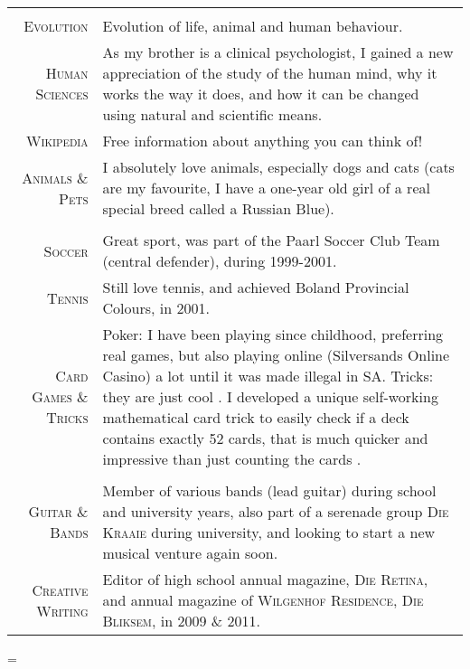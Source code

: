 \documentclass[a4paper,10pt,notitlepage]{article}
\newenvironment{absolutelynopagebreak}
  {\par\nobreak\vfil\penalty0\vfilneg
   \vtop\bgroup}
  {\par\xdef\tpd{\the\prevdepth}\egroup
   \prevdepth=\tpd}
\begin{document}
\begin{absolutelynopagebreak}
\begin{tabular}{r|p{11cm}}
		\multicolumn{2}{c}{} \\
		  
		\textsc{Evolution}            & Evolution of life, animal and human behaviour.  \\
		\textsc{Human Sciences}       & As my brother is a clinical psychologist, I gained a new appreciation of the study of the human mind, why it works the way it does, and how it can be changed using natural and scientific means. \\
		\textsc{Wikipedia}            & Free information about anything you can think of! \\
		\textsc{Animals \& Pets}      & I absolutely love animals, especially dogs and cats (cats are my favourite, I have a one-year old girl of a real special breed called a Russian Blue). \\
		 
		\multicolumn{2}{c}{} \\
		  
		\textsc{Soccer}               & Great sport, was part of the Paarl Soccer Club Team (central defender), during 1999-2001. \\
		\textsc{Tennis}               & Still love tennis, and achieved Boland Provincial Colours, in 2001. \\
		\textsc{Card Games \& Tricks} & Poker: I have been playing since childhood, preferring real games, but also playing online (Silversands Online                                      Casino) a lot until it was made illegal in SA. Tricks: they are just cool \smiley{}. I developed a unique                                           self-working mathematical card trick to easily check if a deck contains exactly 52 cards, that is much quicker and                                  impressive than just counting the cards \smiley{}. \\
		 
		\multicolumn{2}{c}{} \\
		 
		\textsc{Guitar \& Bands}      & Member of various bands (lead guitar) during school and university years, also part of a serenade group \textsc{Die Kraaie} during university, and looking to start a new musical venture again soon. \\
		\textsc{Creative Writing}     & Editor of high school annual magazine, \textsc{Die Retina}, and annual magazine of \textsc{Wilgenhof Residence}, \textsc{Die Bliksem}, in 2009 \& 2011. \\
		 
	\end{tabular}
	
	
	
\end{absolutelynopagebreak}
\end{document}
